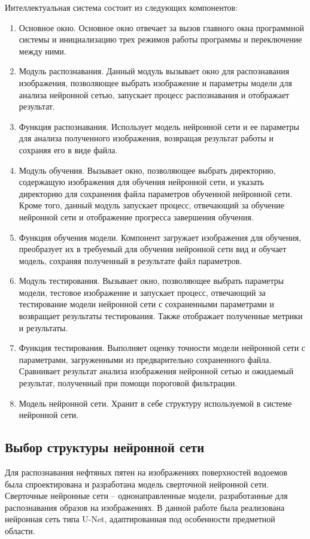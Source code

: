 Интеллектуальная система состоит из следующих компонентов:
\begin{enumerate}
	\item Основное окно. Основное окно отвечает за вызов главного окна программной системы и инициализацию трех режимов работы программы и переключение между ними.
	\item Модуль распознавания. Данный модуль вызывает окно для распознавания изображения, позволяющее выбрать изображение и параметры модели для анализа нейронной сетью, запускает процесс распознавания и отображает результат.
	\item Функция распознавания. Использует модель нейронной сети и ее параметры для анализа полученного изображения, возвращая результат работы и сохраняя его в виде файла.
	\item Модуль обучения. Вызывает окно, позволяющее выбрать директорию, содержащую изображения для обучения нейронной сети, и указать директорию для сохранения файла параметров обученной нейронной сети. Кроме того, данный модуль запускает процесс, отвечающий за обучение нейронной сети и отображение прогресса завершения обучения. 
	\item Функция обучения модели. Компонент загружает изображения для обучения, преобразует их в требуемый для обучения нейронной сети вид и обучает модель, сохраняя полученный в результате файл параметров.
	\item Модуль тестирования. Вызывает окно, позволяющее выбрать параметры модели, тестовое изображение и запускает процесс, отвечающий за тестирование модели нейронной сети с сохраненными параметрами и возвращает результаты тестирования. Также отображает полученные метрики и результаты.
	\item Функция тестирования. Выполняет оценку точности модели нейронной сети с параметрами, загруженными из предварительно сохраненного файла. Сравнивает результат анализа изображения нейронной сетью и ожидаемый результат, полученный при помощи пороговой фильтрации.
	\item Модель нейронной сети. Хранит в себе структуру используемой в системе нейронной сети. 
\end{enumerate}

\subsection{Выбор структуры нейронной сети}

Для распознавания нефтяных пятен на изображениях поверхностей водоемов была спроектирована и разработана модель сверточной нейронной сети. Сверточные нейронные сети -- однонаправленные модели, разработанные для распознавания образов на изображениях. В данной работе была реализована нейронная сеть типа U-Net, адаптированная под особенности предметной области. 

